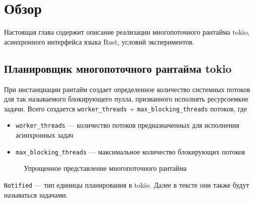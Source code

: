 
\section{Обзор}

Настоящая глава содержит описание реализации многопоточного рантайма tokio, асинхронного интерфейса языка Rust, условий экспериментов.

\subsection{Планировщик многопоточного рантайма tokio}

При инстанциации рантайм создает определенное количество системных потоков для так называемого блокирующего пулла, призванного исполнять ресурсоемкие задачи. Всего создается \verb|worker_threads| + \verb|max_blocking_threads| потоков, где

\begin{itemize}
    \item \verb|worker_threads| --- количество потоков предназначенных для исполнения асинхронных задач
    \item \verb|max_blocking_threads| --- максимальное количество блокирующих потоков
\end{itemize}

\begin{figure}[H]
    \begin{center}
    \end{center}

    \caption{Упрощенное представление многопоточного рантайма}
    \label{fig:tokio:arch}
\end{figure}

\verb|Notified| --- тип единицы планирования в tokio. Далее в тексте они также будут называться задачами.

